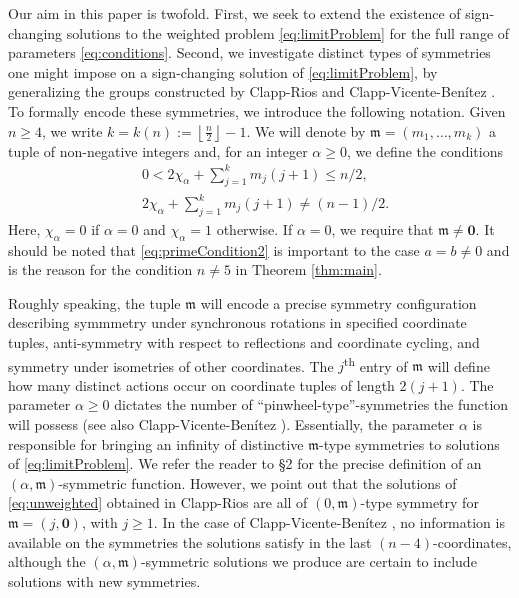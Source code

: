 \documentclass[10pt, reqno]{amsart}
\newcommand{\m}{\mathfrak{m}}
\numberwithin{equation}{section}
\theoremstyle{definition}
\theoremstyle{remark}
\theoremstyle{plain}
\begin{document}
	
	Our aim in this paper is twofold. First, we seek to extend the existence of sign-changing solutions to the weighted problem \eqref{eq:limitProblem} for the full range of parameters \eqref{eq:conditions}. Second, we investigate distinct types of symmetries one might impose on a sign-changing solution of \eqref{eq:limitProblem}, by generalizing the groups constructed by Clapp-Rios \cite{clappRios} and Clapp-Vicente-Ben\'itez \cite{clapp2026entire}. To formally encode these symmetries, we introduce the following notation. Given $n \ge 4$, we write $k = k(n) := \left\lfloor \frac{n}{2}\right\rfloor - 1$. We will denote by $\m = (m_1,\dots,m_k)$ a tuple of non-negative integers and, for an integer $\alpha \ge 0$, we define the conditions 
	\begin{align}
		&0 < 2\chi_\alpha  + \textstyle\sum_{j=1}^k m_j(j+1) \le n/2,\label{eq:primeCondition}\\
		&\textstyle 2\chi_\alpha + \sum_{j=1}^k m_j(j+1) \ne (n-1)/2.\label{eq:primeCondition2}
	\end{align}
	Here, $\chi_\alpha = 0$ if $\alpha = 0$ and $\chi_\alpha = 1$ otherwise. If $\alpha = 0$, we require that $\m \ne \mathbf{0}$. It should be noted that \eqref{eq:primeCondition2} is important to the case $a=b \ne 0$ and is the reason for the condition $n \ne 5$ in Theorem \ref{thm:main}.
		
	Roughly speaking, the tuple $\m$ will encode a precise symmetry configuration describing symmmetry under synchronous rotations in specified coordinate tuples, anti-symmetry  with respect to reflections and coordinate cycling, and symmetry under isometries of other coordinates. The $j$\textsuperscript{th} entry of $\m$ will define how many distinct actions occur on coordinate tuples of length $2(j+1)$. The parameter $\alpha \ge 0$ dictates the number of ``pinwheel-type''-symmetries the function will possess (see also Clapp-Vicente-Ben\'itez \cite{clapp2026entire}). Essentially, the parameter $\alpha$ is responsible for bringing an infinity of distinctive $\m$-type symmetries to solutions of \eqref{eq:limitProblem}. We refer the reader to \S2 for the precise definition of an $(\alpha,\m)$-symmetric function. However, we point out that the solutions of \eqref{eq:unweighted} obtained in Clapp-Rios \cite{clappRios} are all of $(0,\m)$-type symmetry for $\m = (j,\mathbf{0})$, with $j \ge 1$. In the case of Clapp-Vicente-Ben\'itez \cite{clapp2026entire}, no information is available on the symmetries the solutions satisfy in the last $(n-4)$-coordinates, although the $(\alpha,\m)$-symmetric solutions we produce are certain to include solutions with new symmetries.
	
\end{document}
